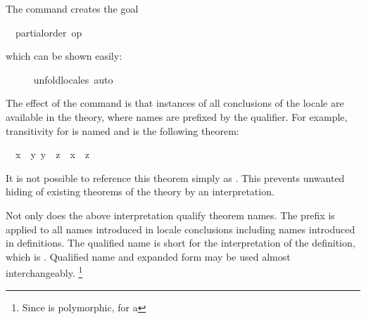 \begin{isabellebody}
\begin{isamarkuptxt}
  The command creates the goal
  \begin{isabelle}%
\ {}{}\ partial{}order\ op\ {}%
\end{isabelle} which can be shown easily:%
\end{isamarkuptxt}%
\isamarkuptrue%
\ \ \ \ \isamarkupfalse%
\ unfold{}locales\ auto%
\endisatagvisible
{\isafoldvisible}%
%
\isadelimvisible
%
\endisadelimvisible
%
\begin{isamarkuptext}%
The effect of the command is that instances of all
  conclusions of the locale are available in the theory, where names
  are prefixed by the qualifier.  For example, transitivity for  is named  and is the following
  theorem:
  \begin{isabelle}%
\ \ {}{}x\ {}\ {}y{}\ {}y\ {}\ {}z{}\ {}\ {}x\ {}\ {}z%
\end{isabelle}
  It is not possible to reference this theorem simply as .  This prevents unwanted hiding of existing theorems of the
  theory by an interpretation.%
\end{isamarkuptext}%
\isamarkuptrue%
%
\isamarkuptrue%
%
\begin{isamarkuptext}%
Not only does the above interpretation qualify theorem names.
  The prefix  is applied to all names introduced in locale
  conclusions including names introduced in definitions.  The
  qualified name  is short for
  the interpretation of the definition, which is .
  Qualified name and expanded form may be used almost
  interchangeably.%
\footnote{Since  is polymorphic, for  a
}
\end{isamarkuptext}
\end{isabellebody}
